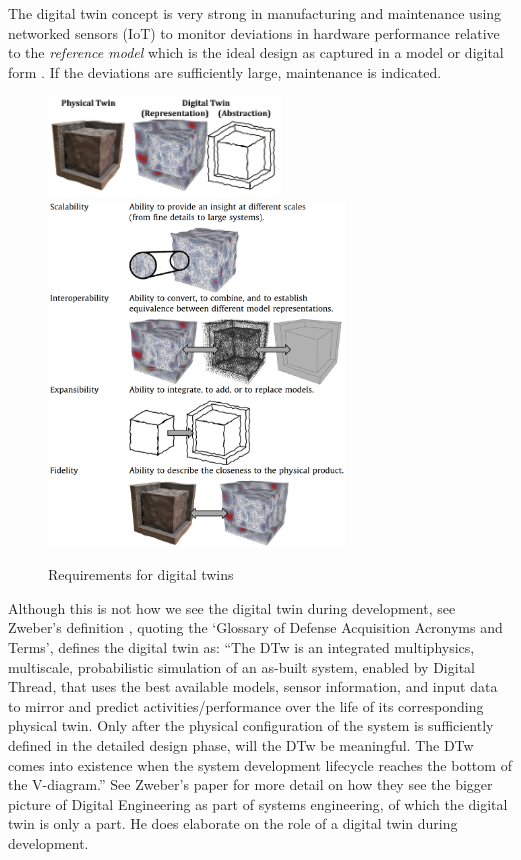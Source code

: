 The digital twin concept is very strong in manufacturing and maintenance using networked sensors (\ac{IoT}) to monitor deviations in  hardware performance relative to the \textit{reference model} which is the ideal design as captured in a model or digital form \cite{Tao2017-0233-1}.  If the deviations are sufficiently large, maintenance is indicated.


\begin{figure}[tp]
\includegraphics[width=0.55\textwidth]{pic/digitaltwin01}
\includegraphics[width=0.7\textwidth]{pic/digitaltwin02}
\caption{Requirements for digital twins \cite{Schleich-2017}\label{fig:digitaltwin01}}
\end{figure}

Although this is not how we see the digital twin during development, see Zweber's definition \cite{Zweber2017}, quoting the `Glossary of Defense Acquisition Acronyms and Terms', defines the digital twin as: ``The \ac{DTw} is an integrated multiphysics, multiscale, probabilistic simulation of an as-built system, enabled by Digital Thread, that uses the best available models, sensor information, and input data to mirror and predict activities/performance over the life of its corresponding physical twin.  Only after the physical configuration of the system is sufficiently defined in the detailed design phase, will the DTw be meaningful. The DTw comes into existence when
the system development lifecycle reaches the bottom of the V-diagram.'' See Zweber's paper \cite{Zweber2017} for more detail on how they see the bigger picture of Digital Engineering as part of systems engineering, of which the digital twin is only a part.  He does elaborate on the role of a digital twin during development. 

